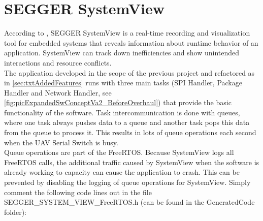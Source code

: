 \section{SEGGER SystemView}
According to \cite{SeggerSystemView}, SEGGER SystemView is a real-time recording and visualization tool for embedded systems that reveals information about runtime behavior of an application. SystemView can  track down inefficiencies and show unintended interactions and resource conflicts.\\
The application developed in the scope of the previous project and refactored as in \autoref{sec:txtAddedFeatures} runs with three main tasks (SPI Handler, Package Handler and Network Handler, see \autoref{fig:picExpandedSwConceptVa2_BeforeOverhaul}) that provide the basic functionality of the software. Task intercommunication is done with queues, where one task always pushes data to a queue and another task pops this data from the queue to process it. This results in lots of queue operations each second when the UAV Serial Switch is busy.\\
Queue operations are part of the FreeRTOS. Because SystemView logs all FreeRTOS calls, the additional traffic caused by SystemView when the software is already working to capacity can cause the application to crash. This can be prevented by disabling the logging of queue operations for SystemView. Simply comment the following code lines out in the file SEGGER\_SYSTEM\_VIEW\_FreeRTOS.h (can be found in the GeneratedCode folder):\\
